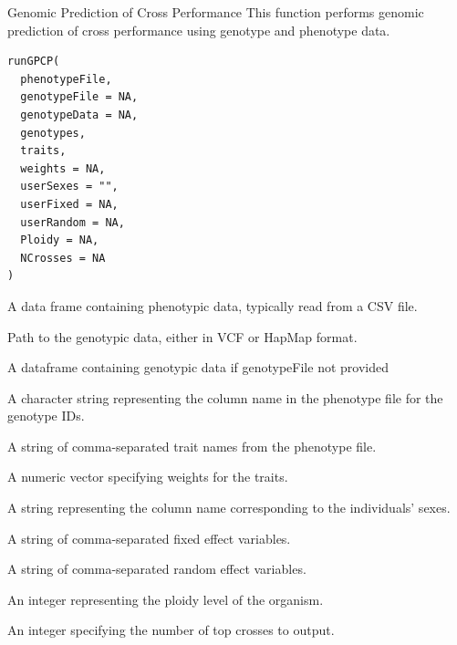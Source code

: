 \documentclass[letterpaper]{book}
\begin{document}
%
\begin{Description}
Genomic Prediction of Cross Performance
This function performs genomic prediction of cross performance using genotype and phenotype data.
\end{Description}
%
\begin{Usage}
\begin{verbatim}
runGPCP(
  phenotypeFile,
  genotypeFile = NA,
  genotypeData = NA,
  genotypes,
  traits,
  weights = NA,
  userSexes = "",
  userFixed = NA,
  userRandom = NA,
  Ploidy = NA,
  NCrosses = NA
)
\end{verbatim}
\end{Usage}
%
\begin{Arguments}
\begin{ldescription}
\item[\code{phenotypeFile}] A data frame containing phenotypic data, typically read from a CSV file.

\item[\code{genotypeFile}] Path to the genotypic data, either in VCF or HapMap format.

\item[\code{genotypeData}] A dataframe containing genotypic data if genotypeFile not provided

\item[\code{genotypes}] A character string representing the column name in the phenotype file for the genotype IDs.

\item[\code{traits}] A string of comma-separated trait names from the phenotype file.

\item[\code{weights}] A numeric vector specifying weights for the traits.

\item[\code{userSexes}] A string representing the column name corresponding to the individuals' sexes.

\item[\code{userFixed}] A string of comma-separated fixed effect variables.

\item[\code{userRandom}] A string of comma-separated random effect variables.

\item[\code{Ploidy}] An integer representing the ploidy level of the organism.

\item[\code{NCrosses}] An integer specifying the number of top crosses to output.
\end{ldescription}
\end{Arguments}
\end{document}
